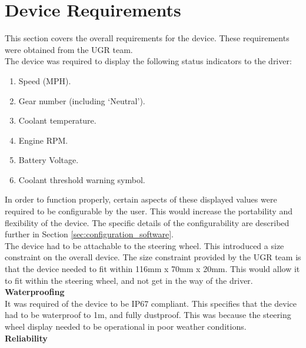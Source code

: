 \documentclass[a4paper,12pt]{article}
\begin{document}



\newpage
\section{Device Requirements}
\label{sec:device_requirements}

This section covers the overall requirements for the device. These requirements were obtained from the UGR team. \\

The device was required to display the following status indicators to the driver:

\begin{enumerate}
  \item Speed (MPH).
  \item Gear number (including `Neutral').
  \item Coolant temperature.
  \item Engine RPM.
  \item Battery Voltage.
  \item Coolant threshold warning symbol.
\end{enumerate}

In order to function properly, certain aspects of these displayed values were required to be configurable by the user. This would increase the portability and flexibility of the device. The specific details of the configurability are described further in Section \ref{sec:configuration_software}. \\

The device had to be attachable to the steering wheel. This introduced a size constraint on the overall device. The size constraint provided by the UGR team is that the device needed to fit within 116mm x 70mm x 20mm. This would allow it to fit within the steering wheel, and not get in the way of the driver. \\

\textbf{Waterproofing} \\

It was required of the device to be IP67 compliant. This specifies that the device had to be waterproof to 1m, and fully dustproof. This was because the steering wheel display needed to be operational in poor weather conditions. \\

\textbf{Reliability} \\
\end{document}
